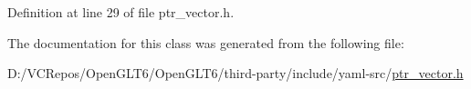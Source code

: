 Definition at line 29 of file ptr\+\_\+vector.\+h.



The documentation for this class was generated from the following file\+:\begin{DoxyCompactItemize}
\item 
D\+:/\+V\+C\+Repos/\+Open\+G\+L\+T6/\+Open\+G\+L\+T6/third-\/party/include/yaml-\/src/\mbox{\hyperlink{ptr__vector_8h}{ptr\+\_\+vector.\+h}}\end{DoxyCompactItemize}
